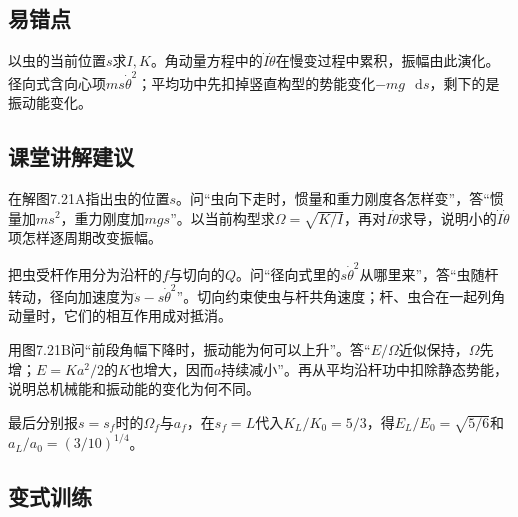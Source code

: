 \documentclass[UTF8,fontset=fandol,a4paper,11pt]{ctexart}
\newcommand{\dd}{\mathop{}\!\mathrm{d}}
\begin{document}

\subsection*{易错点}

以虫的当前位置$s$求$I,K$。角动量方程中的$\dot I\dot\theta$在慢变过程中累积，振幅由此演化。径向式含向心项$ms\dot\theta^2$；平均功中先扣掉竖直构型的势能变化$-mg\,\dd s$，剩下的是振动能变化。




\subsection*{课堂讲解建议}

在解图7.21A指出虫的位置$s$。问“虫向下走时，惯量和重力刚度各怎样变”，答“惯量加$ms^2$，重力刚度加$mgs$”。以当前构型求$\Omega=\sqrt{K/I}$，再对$I\dot\theta$求导，说明小的$\dot I\dot\theta$项怎样逐周期改变振幅。

把虫受杆作用分为沿杆的$f$与切向的$Q$。问“径向式里的$s\dot\theta^2$从哪里来”，答“虫随杆转动，径向加速度为$\ddot s-s\dot\theta^2$”。切向约束使虫与杆共角速度；杆、虫合在一起列角动量时，它们的相互作用成对抵消。

用图7.21B问“前段角幅下降时，振动能为何可以上升”。答“$E/\Omega$近似保持，$\Omega$先增；$E=Ka^2/2$的$K$也增大，因而$a$持续减小”。再从平均沿杆功中扣除静态势能，说明总机械能和振动能的变化为何不同。

最后分别报$s=s_f$时的$\Omega_f$与$a_f$，在$s_f=L$代入$K_L/K_0=5/3$，得$E_L/E_0=\sqrt{5/6}$和$a_L/a_0=(3/10)^{1/4}$。




\subsection*{变式训练}
\end{document}
